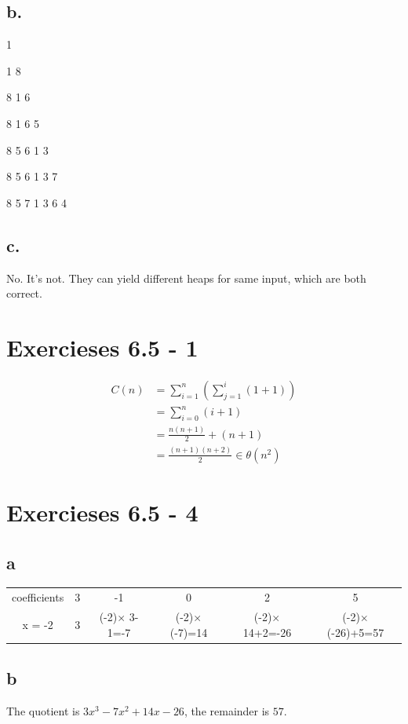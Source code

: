 \documentclass{article}
\begin{document}
\subsection*{b. }

1

1 8

8 1 6

8 1 6 5

8 5 6 1 3

8 5 6 1 3 7

8 5 7 1 3 6 4


\subsection*{c. }

No. It's not. They can yield different heaps for same input, which are both correct.

\section{Exercieses 6.5 - 1}
\begin{align*}
C(n) &= \sum_{i=1}^n(\sum_{j=1}^i(1+1)) \\
&= \sum_{i=0}^n(i+1)\\
&= \frac{n(n+1)}{2} + (n+1)\\
&= \frac{(n+1)(n+2)}{2} \in \theta(n^2)
\end{align*}

\section{Exercieses 6.5 - 4}

\subsection*{a}

\begin{tabular}{cccccc}
\hline
coefficients & 3 & -1 & 0 & 2 & 5\\
x = -2 & 3 & (-2)$\times$ 3-1=-7 & (-2)$\times$ (-7)=14 & (-2)$\times$ 14+2=-26 &(-2)$\times$ (-26)+5=57\\
\hline
\end{tabular}

\subsection*{b}

The quotient is $3x^3 - 7x^2 + 14x -26$, the remainder is $57$.
\end{document}
